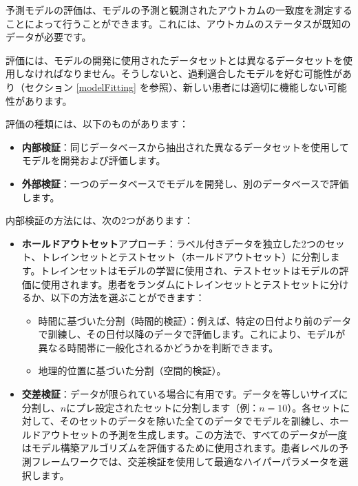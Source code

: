 \documentclass[
  11pt]{book}
\makeatletter
\providecommand{\tightlist}{%
  \setlength{\itemsep}{0pt}\setlength{\parskip}{0pt}}
\newenvironment{kframe}{%
\medskip{}
\setlength{\fboxsep}{.8em}
 \def\at@end@of@kframe{}%
 \ifinner\ifhmode%
  \def\at@end@of@kframe{\end{minipage}}%
  \begin{minipage}{\columnwidth}%
 \fi\fi%
 \def\FrameCommand##1{\hskip\@totalleftmargin \hskip-\fboxsep
 \colorbox{myShadeColor}{##1}\hskip-\fboxsep
     \hskip-\linewidth \hskip-\@totalleftmargin \hskip\columnwidth}%
 \MakeFramed {\advance\hsize-\width
   \@totalleftmargin\z@ \linewidth\hsize
   \@setminipage}}%
 {\par\unskip\endMakeFramed%
 \at@end@of@kframe}
\newenvironment{rmdblock}[1]
  {
  \begin{itemize}
  \renewcommand{\labelitemi}{
    \raisebox{-.7\height}[0pt][0pt]{
      {\setkeys{Gin}{width=3em,keepaspectratio}\texttt{[image: images/\#1]}}
    }
  }
  \setlength{\fboxsep}{1em}
  \begin{kframe}
  \item
  }
  {
  \end{kframe}
  \end{itemize}
  }
\newenvironment{rmdimportant}
  {\begin{rmdblock}{important}}
  {\end{rmdblock}}
\theoremstyle{definition}
\theoremstyle{definition}
\theoremstyle{definition}
\theoremstyle{definition}
\theoremstyle{remark}
\makeatother
\begin{document}
予測モデルの評価は、モデルの予測と観測されたアウトカムの一致度を測定することによって行うことができます。これには、アウトカムのステータスが既知のデータが必要です。 

\begin{rmdimportant}
評価には、モデルの開発に使用されたデータセットとは異なるデータセットを使用しなければなりません。そうしないと、過剰適合したモデルを好む可能性があり（セクション \ref{modelFitting} を参照）、新しい患者には適切に機能しない可能性があります。
\end{rmdimportant}

評価の種類には、以下のものがあります：

\begin{itemize}
\tightlist
\item
  \textbf{内部検証}：同じデータベースから抽出された異なるデータセットを使用してモデルを開発および評価します。
\item
  \textbf{外部検証}：一つのデータベースでモデルを開発し、別のデータベースで評価します。  
\end{itemize}

内部検証の方法には、次の2つがあります：

\begin{itemize}
\tightlist
\item
  \textbf{ホールドアウトセット}アプローチ：ラベル付きデータを独立した2つのセット、トレインセットとテストセット（ホールドアウトセット）に分割します。トレインセットはモデルの学習に使用され、テストセットはモデルの評価に使用されます。患者をランダムにトレインセットとテストセットに分けるか、以下の方法を選ぶことができます：

  \begin{itemize}
  \tightlist
  \item
    時間に基づいた分割（時間的検証）：例えば、特定の日付より前のデータで訓練し、その日付以降のデータで評価します。これにより、モデルが異なる時間帯に一般化されるかどうかを判断できます。
  \item
    地理的位置に基づいた分割（空間的検証）。 
  \end{itemize}
\item
  \textbf{交差検証}：データが限られている場合に有用です。データを等しいサイズに分割し、\(n\)にプレ設定されたセットに分割します（例：\(n=10\)）。各セットに対して、そのセットのデータを除いた全てのデータでモデルを訓練し、ホールドアウトセットの予測を生成します。この方法で、すべてのデータが一度はモデル構築アルゴリズムを評価するために使用されます。患者レベルの予測フレームワークでは、交差検証を使用して最適なハイパーパラメータを選択します。 
\end{itemize}
\end{document}
